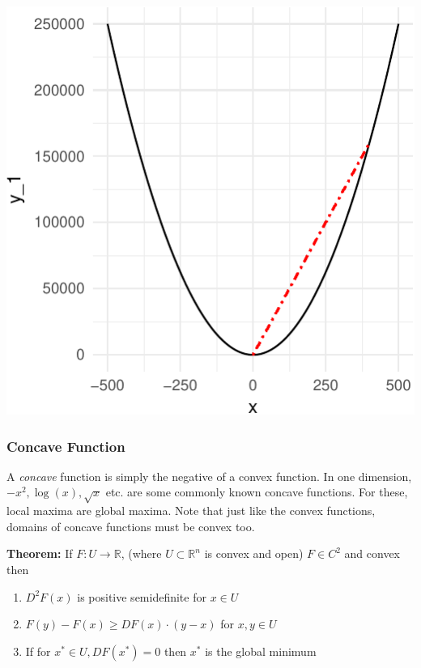 \documentclass[11pt,]{article}
\providecommand{\tightlist}{%
  \setlength{\itemsep}{0pt}\setlength{\parskip}{0pt}}
\begin{document}
\begin{center}\includegraphics{Optimization_files/figure-latex/func_convex-1} \end{center}

\subsubsection{Concave Function}\label{concave-function}

A \emph{concave} function is simply the negative of a convex function.
In one dimension, \(-x^2, \log(x), \sqrt{x}\) etc. are some commonly
known concave functions. For these, local maxima are global maxima. Note
that just like the convex functions, domains of concave functions must
be convex too.

\textbf{Theorem:} If \(F:U \to \mathbb{R}\), (where
\(U\subset \mathbb{R}^n\) is convex and open) \(F\in C^2\) and convex
then

\begin{enumerate}
\def\labelenumi{\arabic{enumi}.}
\tightlist
\item
  \(D^2F(x)\) is positive semidefinite for \(x\in U\)
\item
  \(F(y)-F(x)\geq DF(x)\cdot(y-x)\) for \(x, y\in U\)
\item
  If for \(x^*\in U, DF(x^*)=0\) then \(x^*\) is the global minimum
\end{enumerate}
\end{document}
